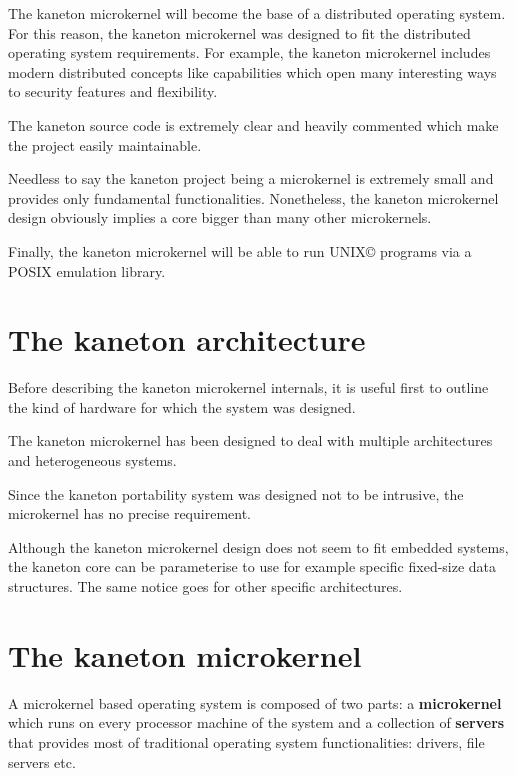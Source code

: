 \begin{multicols}{2}
The kaneton microkernel will become the base of a distributed operating
system. For this reason, the kaneton microkernel was designed to fit
the distributed operating system requirements. For example, the kaneton
microkernel includes modern distributed concepts like capabilities
which open many interesting ways to security features and flexibility.

The kaneton source code is extremely clear and heavily commented which
make the project easily maintainable.

Needless to say the kaneton project being a microkernel is extremely small
and provides only fundamental functionalities. Nonetheless, the kaneton
microkernel design obviously implies a core bigger than many other
microkernels.

Finally, the kaneton microkernel will be able to run
UNIX{\scriptsize \copyright} programs via a POSIX emulation library.

%
%

\section{The kaneton architecture}

Before describing the kaneton microkernel internals, it is useful first to
outline the kind of hardware for which the system was designed.

The kaneton microkernel has been designed to deal with multiple architectures
and heterogeneous systems.

Since the kaneton portability system was designed not to be intrusive, the
microkernel has no precise requirement.

Although the kaneton microkernel design does not seem to fit embedded
systems, the kaneton core can be parameterise to use for example specific
fixed-size data structures. The same notice goes for other specific
architectures.

%
%

\section{The kaneton microkernel}

A microkernel based operating system is composed of two parts:
a \textbf{microkernel} which runs on every processor machine of the system
and a collection of \textbf{servers} that provides most of traditional
operating system functionalities: drivers, file servers etc.


\end{multicols}
